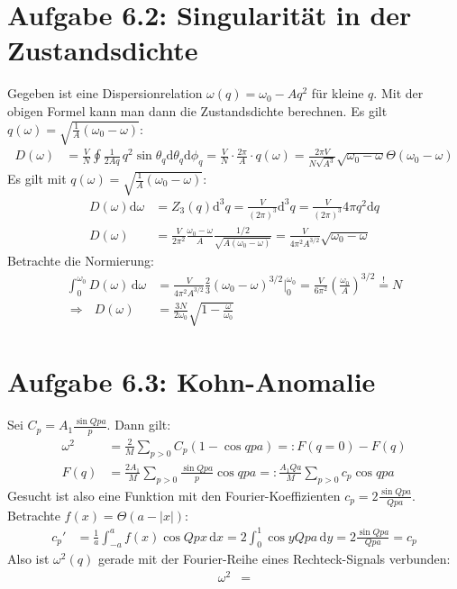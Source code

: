 \documentclass[a4paper,12pt]{article}
\newcommand{\intx}{}
\newcommand{\kla}{}
\newcommand{\tecxt}{}
\begin{document}
\section*{Aufgabe 6.2: Singularität in der Zustandsdichte}
Gegeben ist eine Dispersionrelation $\omega(q)=\omega_0-Aq^2$ für kleine $q$. Mit der obigen Formel kann man dann die Zustandsdichte berechnen. Es gilt $q(\omega)=\sqrt{\frac{1}{A}(\omega_0-\omega)}$:
\begin{align*}
D(\omega)&=\frac{V}{N}\oint\frac{1}{2Aq}\, q^2\sin\theta_q\mathrm{d}\theta_q\mathrm{d}\phi_q=\frac{V}{N}\cdot \frac{2\pi}{A}\cdot q(\omega)=\frac{2\pi V}{N\sqrt{A^3}}\sqrt{\omega_0-\omega}\Theta(\omega_0-\omega)
\end{align*}
Es gilt mit $q(\omega)=\sqrt{\frac{1}{A}(\omega_0-\omega)}$:
\begin{align*}
D(\omega)\tecxt\text{d}\omega&=Z_3(q)\tecxt\text{d}^3q=\frac{V}{(2\pi)^3}\tecxt\text{d}^3q=\frac{V}{(2\pi)^3}4\pi q^2\tecxt\text{d}q\\
D(\omega)&=\frac{V}{2\pi^2}\frac{\omega_0-\omega}{A}\frac{1/2}{\sqrt{A(\omega_0-\omega)}}=\frac{V}{4\pi^2A^{3/2}}\sqrt{\omega_0-\omega}
\end{align*}
Betrachte die Normierung:
\begin{align*}
\intx\int_{0}^{\omega_0}D(\omega)\,\mathrm{d}\omega &=\frac{V}{4\pi^2A^{3/2}}\frac{2}{3}(\omega_0-\omega)^{3/2}\Big\vert^{\omega_0}_0=\frac{V}{6\pi^2}\kla\left( {\frac{\omega_0}{A}} \right)^{3/2}\overset{!}{=}N\\
\Rightarrow\ \ \ D(\omega)&=\frac{3N}{2\omega_0}\sqrt{1-\frac{\omega}{\omega_0}}
\end{align*}
\section*{Aufgabe 6.3: Kohn-Anomalie}
Sei $C_p=A_1\frac{\sin Qpa}{p}$. Dann gilt:
\begin{align*}
\omega^2&=\frac{2}{M}\sum_{p>0}C_p(1-\cos qpa)=:F(q=0)-F(q)\\
F(q)&=\frac{2A_1}{M}\sum_{p>0}\frac{\sin Qpa}{p}\cos qpa=:\frac{A_1Qa}{M}\sum_{p>0}c_p\cos qpa
\end{align*}
Gesucht ist also eine Funktion mit den Fourier-Koeffizienten $c_p=2\frac{\sin Qpa}{Qpa}$. Betrachte $f(x)=\Theta(a-|x|)$:
\begin{align*}
c_p'&=\frac{1}{a}\intx\int_{-a}^{a}f(x)\cos Qpx \,\mathrm{d}x=2\intx\int_{0}^{1}\cos yQpa \,\mathrm{d}y=2\frac{\sin Qpa}{Qpa}=c_p
\end{align*}
Also ist $\omega^2(q)$ gerade mit der Fourier-Reihe eines Rechteck-Signals verbunden:
\begin{align*}
\omega^2&=
\end{align*}
\end{document}
